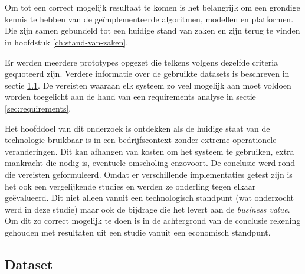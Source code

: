 
\chapter{}
\label{ch:methodologie}


Om tot een correct mogelijk resultaat te komen is het belangrijk om een grondige kennis te hebben van de geïmplementeerde algoritmen, modellen en platformen. Die zijn samen gebundeld tot een huidige stand van zaken en zijn terug te vinden in hoofdstuk \ref{ch:stand-van-zaken}.

Er werden meerdere prototypes opgezet die telkens volgens dezelfde criteria gequoteerd zijn. Verdere informatie over de gebruikte datasets is beschreven in sectie \ref{sec:datasets}. De vereisten waaraan elk systeem zo veel mogelijk aan moet voldoen worden toegelicht aan de hand van een requirements analyse in sectie \ref{sec:requirements}.

Het hoofddoel van dit onderzoek is ontdekken als de huidige staat van de technologie bruikbaar is in een bedrijfscontext zonder extreme operationele veranderingen. Dit kan afhangen van kosten om het systeem te gebruiken, extra mankracht die nodig is, eventuele omscholing enzovoort. De conclusie werd rond die vereisten geformuleerd. Omdat er verschillende implementaties getest zijn is het ook een vergelijkende studies en werden ze onderling tegen elkaar geëvalueerd. Dit niet alleen vanuit een technologisch standpunt (wat onderzocht werd in deze studie) maar ook de bijdrage die het levert aan de \textit{business value}. Om dit zo correct mogelijk te doen is in de achtergrond van de conclusie rekening gehouden met resultaten uit een studie vanuit een economisch standpunt. 

\section{Dataset}
\label{sec:datasets}

